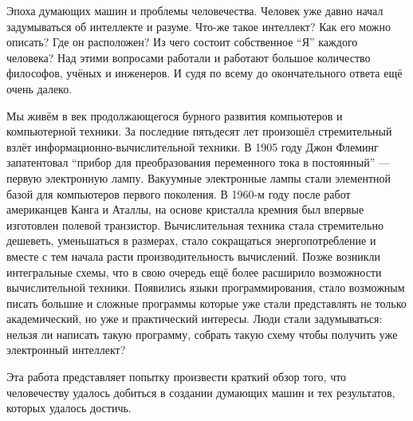 
Эпоха думающих машин и проблемы человечества.
Человек уже давно начал задумываться об интеллекте и разуме. Что-же такое интеллект? Как его можно описать? Где он расположен? Из чего состоит собственное ``Я'' каждого человека? Над этими вопросами работали и работают большое количество философов, учёных и инженеров. И судя по всему до окончательного ответа ещё очень далеко.

Мы живём в век продолжающегося бурного развития компьютеров и компьютерной техники. За последние пятьдесят лет произошёл стремительный взлёт информационно-вычислительной техники. В 1905 году Джон Флеминг запатентовал ``прибор для преобразования переменного тока в постоянный'' --- первую электронную лампу. Вакуумные электронные лампы стали элементной базой для компьютеров первого поколения. В 1960-м году после работ американцев Канга и Аталлы, на основе кристалла кремния был впервые изготовлен полевой транзистор. Вычислительная техника стала стремительно дешеветь, уменьшаться в размерах, стало сокращаться энергопотребление и вместе с тем начала расти производительность вычислений. Позже возникли интегральные схемы, что в свою очередь ещё более расширило возможности вычислительной техники. Появились языки программирования, стало возможным писать большие и сложные программы которые уже стали представлять не только академический, но уже и практический интересы. Люди стали задумываться: нельзя ли написать такую программу, собрать такую схему чтобы получить уже электронный интеллект?

Эта работа представляет попытку произвести краткий обзор того, что человечеству удалось добиться в создании думающих машин и тех результатов, которых удалось достичь.

\pagebreak
